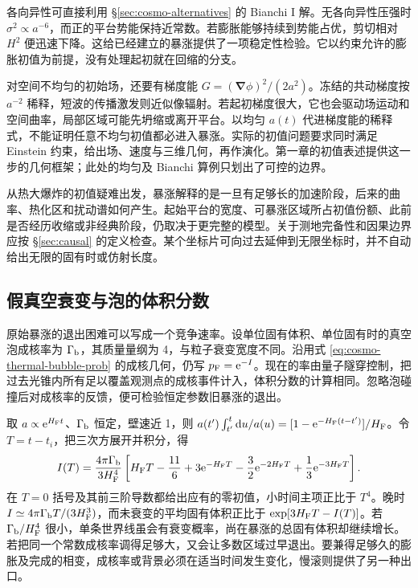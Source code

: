 各向异性可直接利用 \S\ref{sec:cosmo-alternatives} 的 Bianchi I 解。无各向异性压强时 $\sigma^2\propto a^{-6}$，而正的平台势能保持近常数。若膨胀能够持续到势能占优，剪切相对 $H^2$ 便迅速下降。这给已经建立的暴涨提供了一项稳定性检验。它以约束允许的膨胀初值为前提，没有处理起初就在回缩的分支。

对空间不均匀的初始场，还要有梯度能 $G=(\bm\nabla\phi)^2/(2a^2)$。冻结的共动梯度按 $a^{-2}$ 稀释，短波的传播激发则近似像辐射。若起初梯度很大，它也会驱动场运动和空间曲率，局部区域可能先坍缩或离开平台。以均匀 $a(t)$ 代进梯度能的稀释式，不能证明任意不均匀初值都必进入暴涨。实际的初值问题要求同时满足 Einstein 约束，给出场、速度与三维几何，再作演化。第一章的初值表述提供这一步的几何框架；此处的均匀及 Bianchi 算例只划出了可控的边界。

从热大爆炸的初值疑难出发，暴涨解释的是一旦有足够长的加速阶段，后来的曲率、热化区和扰动谱如何产生。起始平台的宽度、可暴涨区域所占初值份额、此前是否经历收缩或非经典阶段，仍取决于更完整的模型。关于测地完备性和因果边界应按 \S\ref{sec:causal} 的定义检查。某个坐标片可向过去延伸到无限坐标时，并不自动给出无限的固有时或仿射长度。

\subsection{假真空衰变与泡的体积分数}\label{sec:cosmo-inf-bubbles}

原始暴涨的退出困难可以写成一个竞争速率。设单位固有体积、单位固有时的真空泡成核率为 $\Gamma_{\rm b}$，其质量量纲为 4，与粒子衰变宽度不同。沿用式 \eqref{eq:cosmo-thermal-bubble-prob} 的成核几何，仍写 $p_{\rm F}=\mathrm{e}^{-I}$。现在的率由量子隧穿控制，把过去光锥内所有足以覆盖观测点的成核事件计入，体积分数的计算相同。忽略泡碰撞后对成核率的反馈，便可检验恒定参数旧暴涨的退出。

取 $a\propto\mathrm{e}^{H_{\rm F}t}$、$\Gamma_{\rm b}$ 恒定，壁速近 1，则 $a(t')\int_{t'}^t\dd u/a(u)=[1-\mathrm{e}^{-H_{\rm F}(t-t')}]/H_{\rm F}$。令 $T=t-t_i$，把三次方展开并积分，得
\[
 I(T)=\frac{4\pi\Gamma_{\rm b}}{3H_{\rm F}^4}
 \left[H_{\rm F}T-\frac{11}{6}+3\mathrm{e}^{-H_{\rm F}T}
       -\frac32\mathrm{e}^{-2H_{\rm F}T}+\frac13\mathrm{e}^{-3H_{\rm F}T}\right].
\]
在 $T=0$ 括号及其前三阶导数都给出应有的零初值，小时间主项正比于 $T^4$。晚时 $I\simeq4\pi\Gamma_{\rm b}T/(3H_{\rm F}^3)$，而未衰变的平均固有体积正比于 $\exp[3H_{\rm F}T-I(T)]$。若 $\Gamma_{\rm b}/H_{\rm F}^4$ 很小，单条世界线虽会有衰变概率，尚在暴涨的总固有体积却继续增长。若把同一个常数成核率调得足够大，又会让多数区域过早退出。要兼得足够久的膨胀及完成的相变，成核率或背景必须在适当时间发生变化，慢滚则提供了另一种出口。

